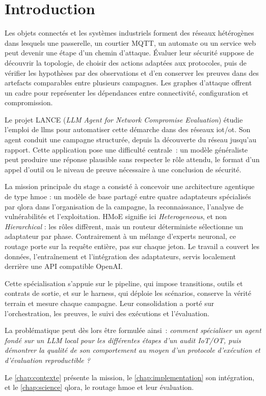 \chapter{Introduction}
\label{chap:introduction}

Les objets connectés et les systèmes industriels forment des réseaux
hétérogènes dans lesquels une passerelle, un courtier MQTT, un automate ou un
service web peut devenir une étape d'un chemin d'attaque. Évaluer leur sécurité
suppose de découvrir la topologie, de choisir des actions adaptées aux
protocoles, puis de vérifier les hypothèses par des observations et d'en
conserver les preuves dans des artefacts comparables entre plusieurs campagnes.
Les graphes d'attaque offrent un cadre pour représenter les dépendances entre
connectivité, configuration et compromission\cite{ou2005mulval}.

Le projet LANCE (\emph{LLM Agent for Network Compromise Evaluation}) étudie
l'emploi de \glspl{llm} pour automatiser cette démarche dans des réseaux
\gls{iot}/\gls{ot}. Son agent conduit une campagne structurée, depuis la
découverte du réseau jusqu'au rapport. Cette application pose une difficulté
centrale~: un modèle généraliste peut produire une réponse plausible sans
respecter le rôle attendu, le format d'un appel d'outil ou le niveau de preuve
nécessaire à une conclusion de sécurité.

La mission principale du stage a consisté à concevoir une architecture agentique
de type \gls{hmoe} : un modèle de base partagé entre quatre adaptateurs
spécialisés par \gls{qlora} dans l'organisation de la campagne, la
reconnaissance, l'analyse de vulnérabilités et l'exploitation. HMoE signifie ici
\emph{Heterogeneous}, et non \emph{Hierarchical} : les rôles diffèrent, mais un
routeur déterministe sélectionne un adaptateur par phase. Contrairement à un
mélange d'experts neuronal, ce routage porte sur la requête entière, pas sur
chaque jeton. Le travail a couvert les données, l'entraînement et l'intégration
des adaptateurs, servis localement derrière une API compatible OpenAI.

Cette spécialisation s'appuie sur le pipeline, qui impose transitions, outils et
contrats de sortie, et sur le harness, qui déploie les scénarios, conserve la
vérité terrain et mesure chaque campagne. Leur consolidation a porté sur
l'orchestration, les preuves, le suivi des exécutions et l'évaluation.

La problématique peut dès lors être formulée ainsi~:
\emph{comment spécialiser un agent fondé sur un LLM local pour les différentes
étapes d'un audit IoT/OT, puis démontrer la qualité de son comportement au moyen
d'un protocole d'exécution et d'évaluation reproductible ?}

Le \cref{chap:contexte} présente la mission, le \cref{chap:implementation} son
intégration, et le \cref{chap:science} \gls{qlora}, le routage \gls{hmoe} et leur
évaluation.
